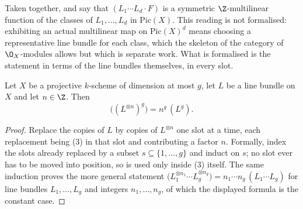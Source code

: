 \begin{remark}
\label{rem:deg-intersection-multilinear-map}
Taken together,  and
 say that $(L_1\cdots L_d\cdot F)$ is a
symmetric $\Z$-multilinear function of the classes of $L_1,\dots,L_d$ in
$\mathrm{Pic}(X)$.  This reading is not formalised: exhibiting an actual
multilinear map on $\mathrm{Pic}(X)^d$ means choosing a representative line
bundle for each class, which the skeleton of the category of $\O_X$-modules
allows but which is separate work.  What is formalised is the statement in
terms of the line bundles themselves, in every slot.
\end{remark}

\begin{corollary}
\label{cor:deg-intersection-powers}
Let $X$ be a projective $k$-scheme of dimension at most $g$, let $L$ be a line
bundle on $X$ and let $n\in\Z$.  Then
\[
  \bigl((L^{\otimes n})^g\bigr)=n^g\,(L^g).
\]
\end{corollary}
\begin{proof}
Replace the copies of $L$ by copies of $L^{\otimes n}$ one slot at a time,
each replacement being (3) in that slot
and contributing a factor $n$.  Formally, index the slots already replaced by a
subset $s\subseteq\{1,\dots,g\}$ and induct on $s$; no slot ever has to be
moved into position, so  is used only
inside (3) itself.  The same induction
proves the more general statement
$\bigl(L_1^{\otimes n_1}\cdots L_g^{\otimes n_g}\bigr)
=n_1\cdots n_g\,(L_1\cdots L_g)$ for line bundles $L_1,\dots,L_g$ and integers
$n_1,\dots,n_g$, of which the displayed formula is the constant case.
\end{proof}

